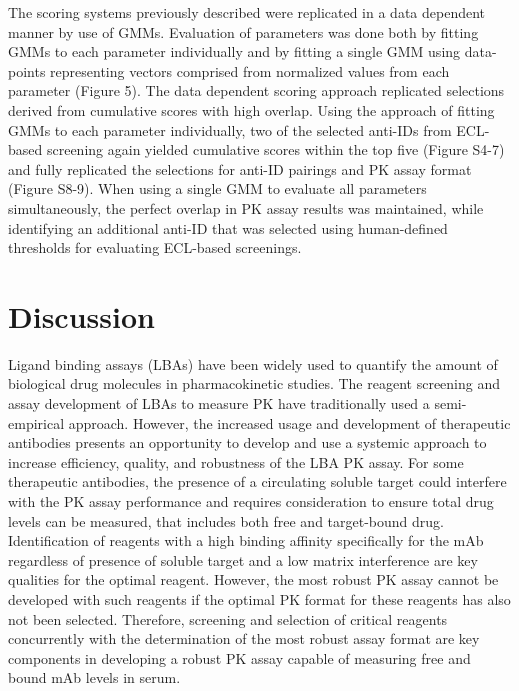The scoring systems previously described were replicated in a data dependent manner by use of GMMs.  Evaluation of parameters was done both by fitting GMMs to each parameter individually and by fitting a single GMM using data-points representing vectors comprised from normalized values from each parameter (Figure 5).  The data dependent scoring approach replicated selections derived from cumulative scores with high overlap.  Using the approach of fitting GMMs to each parameter individually, two of the selected anti-IDs from ECL-based screening again yielded cumulative scores within the top five (Figure S4-7) and fully replicated the selections for anti-ID pairings and PK assay format (Figure S8-9).  When using a single GMM to evaluate all parameters simultaneously, the perfect overlap in PK assay results was maintained, while identifying an additional anti-ID that was selected using human-defined thresholds for evaluating ECL-based screenings.  

\section{Discussion}
Ligand binding assays (LBAs) have been widely used to quantify the amount of biological drug molecules in pharmacokinetic studies.  The reagent screening and assay development of LBAs to measure PK have traditionally used a semi-empirical approach.  However, the increased usage and development of therapeutic antibodies presents an opportunity to develop and use a systemic approach to increase efficiency, quality, and robustness of the LBA PK assay.  For some therapeutic antibodies, the presence of a circulating soluble target could interfere with the PK assay performance and requires consideration to ensure total drug levels can be measured, that includes both free and target-bound drug.  Identification of reagents with a high binding affinity specifically for the mAb regardless of presence of soluble target and a low matrix interference are key qualities for the optimal reagent.  However, the most robust PK assay cannot be developed with such reagents if the optimal PK format for these reagents has also not been selected.  Therefore, screening and selection of critical reagents concurrently with the determination of the most robust assay format are key components in developing a robust PK assay capable of measuring free and bound mAb levels in serum.    
  
